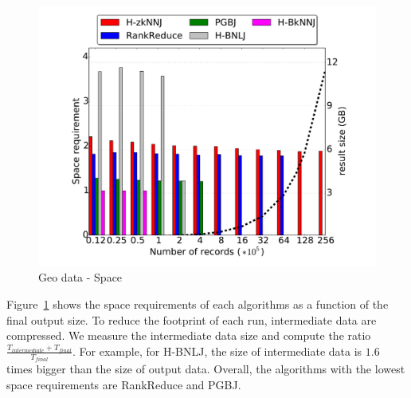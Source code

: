 \begin{figure}[!h]
 \centering
  \includegraphics[scale=0.30]{img-perf/geo/data/memory.pdf} 
  \caption{Geo data - Space\label{geo_data_disk}}
\end{figure}%
      
Figure~\ref{geo_data_disk} shows the space requirements of each algorithms as a function of the final output size. To 
reduce the footprint of each run, intermediate data are compressed. We 
measure the intermediate data size and compute the ratio $\frac{T_{intermediate}+T_{final}}{T_{final}}$. For example, for 
H-BNLJ, the size of intermediate data is $1.6$ times bigger than the size of output data. Overall, the algorithms with the
lowest space requirements are RankReduce and PGBJ.

        

